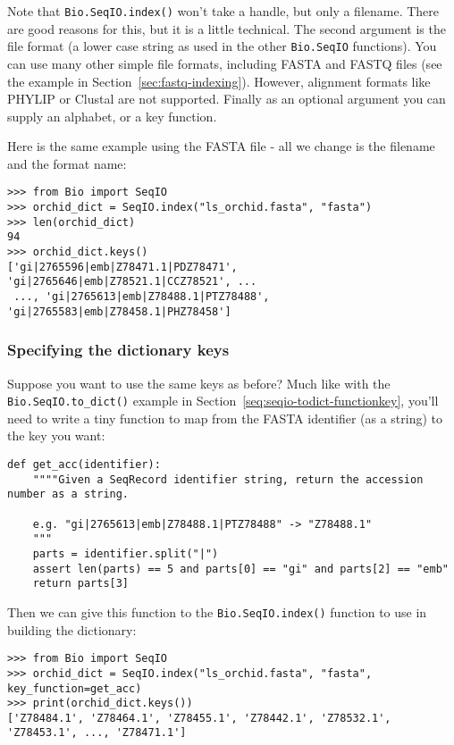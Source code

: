 \documentclass{report}
\begin{document}
\noindent Note that \verb|Bio.SeqIO.index()| won't take a handle,
but only a filename. There are good reasons for this, but it is a little
technical. The second argument is the file format (a lower case string as
used in the other \verb|Bio.SeqIO| functions). You can use many other
simple file formats, including FASTA and FASTQ files (see the example in
Section~\ref{sec:fastq-indexing}). However, alignment
formats like PHYLIP or Clustal are not supported. Finally as an optional
argument you can supply an alphabet, or a key function.

Here is the same example using the FASTA file - all we change is the
filename and the format name:

\begin{verbatim}
>>> from Bio import SeqIO
>>> orchid_dict = SeqIO.index("ls_orchid.fasta", "fasta")
>>> len(orchid_dict)
94
>>> orchid_dict.keys()
['gi|2765596|emb|Z78471.1|PDZ78471', 'gi|2765646|emb|Z78521.1|CCZ78521', ...
 ..., 'gi|2765613|emb|Z78488.1|PTZ78488', 'gi|2765583|emb|Z78458.1|PHZ78458']
\end{verbatim}

\subsubsection{Specifying the dictionary keys}
\label{seq:seqio-index-functionkey}

Suppose you want to use the same keys as before? Much like with the
\verb|Bio.SeqIO.to_dict()| example in Section~\ref{seq:seqio-todict-functionkey},
you'll need to write a tiny function to map from the FASTA identifier
(as a string) to the key you want:

\begin{verbatim}
def get_acc(identifier):
    """"Given a SeqRecord identifier string, return the accession number as a string.
  
    e.g. "gi|2765613|emb|Z78488.1|PTZ78488" -> "Z78488.1"
    """
    parts = identifier.split("|")
    assert len(parts) == 5 and parts[0] == "gi" and parts[2] == "emb"
    return parts[3]
\end{verbatim}

\noindent Then we can give this function to the \verb|Bio.SeqIO.index()|
function to use in building the dictionary:

\begin{verbatim}
>>> from Bio import SeqIO
>>> orchid_dict = SeqIO.index("ls_orchid.fasta", "fasta", key_function=get_acc)
>>> print(orchid_dict.keys())
['Z78484.1', 'Z78464.1', 'Z78455.1', 'Z78442.1', 'Z78532.1', 'Z78453.1', ..., 'Z78471.1']
\end{verbatim}
\end{document}
